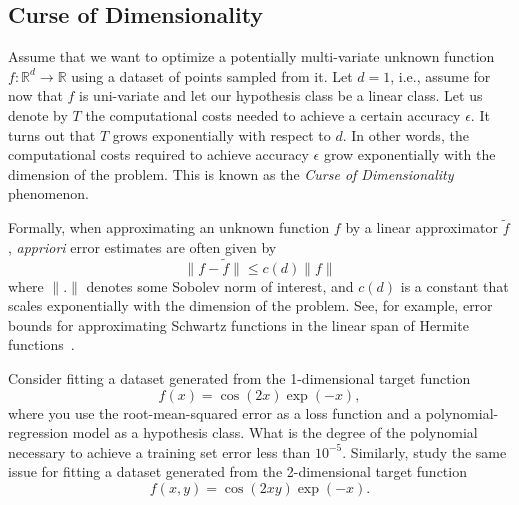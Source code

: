 \subsection{Curse of Dimensionality}
Assume that we want to optimize a potentially multi-variate unknown function $f:
\mathbb{R}^d \to \mathbb{R}$ using a dataset of
points sampled from it. Let $d=1$, i.e., assume for now that $f$ is uni-variate
and let our hypothesis class be a linear class. Let us denote by $T$ the
computational costs needed to achieve a certain accuracy $\epsilon$. It turns
out that $T$ grows exponentially with respect to $d$. In other words, the
computational costs required to achieve accuracy $\epsilon$ grow exponentially
with the dimension of the problem. This is known as the \emph{Curse of
Dimensionality} phenomenon.

Formally, when approximating an unknown function $f$ by a linear approximator
$\tilde{f}$, \emph{appriori} error estimates are often given by
\begin{equation*}
    \|f - \tilde{f}\| \leq c(d) \|f\|
\end{equation*}
where $\|.\|$ denotes some Sobolev norm of interest, and $c(d)$ is a constant that
scales exponentially with the dimension of the problem. See, for example, error
bounds for approximating Schwartz functions in the linear span of Hermite
functions~\cite{Lubich:QCMD}. 
\begin{boxedexample} \complementary{\theexample}
    \label{ex:CoD_fitting}
Consider fitting a dataset generated from the 1-dimensional target function
\begin{equation*}
    f(x) = \cos(2x) \exp(-x),
\end{equation*}
where you use the root-mean-squared error as a loss function and a
polynomial-regression model as a hypothesis class. What is the degree of the
polynomial necessary to achieve a training set error less than $10^{-5}$.
Similarly, study the same issue for fitting a dataset generated from the 2-dimensional target function
\begin{equation*}
    f(x,y) = \cos(2x y) \exp(-x).
\end{equation*}
\end{boxedexample}

